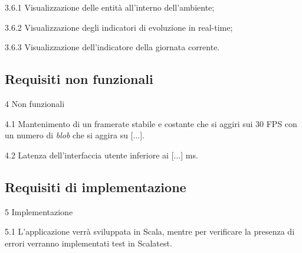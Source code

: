 \begin{myEnumerate}
\begin{myEnumerate}[label*=\arabic*.]
	\begin{myEnumerate}[label*=\arabic*.]
		\item[3.6.1] Visualizzazione delle entità all'interno dell'ambiente;
		\item[3.6.2] Visualizzazione degli indicatori di evoluzione in real-time;
		\item[3.6.3] Visualizzazione dell'indicatore della giornata corrente.
	\end{myEnumerate}
    \end{myEnumerate}
\end{myEnumerate}

\subsection{Requisiti non funzionali}

\begin{myEnumerate}[label*=\arabic*.]
	\item[4] Non funzionali
	\begin{myEnumerate}[label*=\arabic*.]
		\item[4.1] Mantenimento di un framerate stabile e costante che si aggiri sui 30 FPS con un numero di \textit{blob} che si aggira su [...].
		\item[4.2] Latenza dell'interfaccia utente inferiore ai [...] ms.
	\end{myEnumerate}
\end{myEnumerate}


\subsection{Requisiti di implementazione}

\begin{myEnumerate}[label*=\arabic*.]
	\item[5] Implementazione
	\begin{myEnumerate}[label*=\arabic*.]
		\item[5.1] L'applicazione verrà sviluppata in Scala, mentre per verificare la presenza di errori verranno implementati test in Scalatest.
	\end{myEnumerate}
\end{myEnumerate}